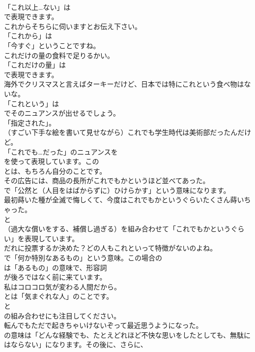 \documentclass[8pt]{extreport}
\begin{document}
\begin{CJK}{UTF8}{min}
\\	「これ以上…ない」は 
\\	で表現できます。	
\\	これからそちらに伺いますとお伝え下さい。 
\\	「これから」は
\\	「今すぐ」ということですね。	
\\	これだけの量の食料で足りるかい。 
\\	「これだけの量」は
\\	で表現できます。	
\\	海外でクリスマスと言えばターキーだけど、日本では特にこれという食べ物はないな。 
\\	「これという」は
\\	でそのニュアンスが出せるでしょう。
\\	「指定された」。	
\\	（すごい下手な絵を書いて見せながら）これでも学生時代は美術部だったんだけど。 
\\	「これでも…だった」のニュアンスを
\\	を使って表現しています。この
\\	とは、もちろん自分のことです。	
\\	その広告には、商品の長所がこれでもかというほど並べてあった。 
\\	で「公然と（人目をはばからずに）ひけらかす」という意味になります。	
\\	最初蒔いた種が全滅で悔しくて、今度はこれでもかというぐらいたくさん蒔いちゃった。 
\\	と 
\\	（過大な償いをする、補償し過ぎる）を組み合わせて「これでもかというぐらい」を表現しています。	
\\	だれに投票するか決めた？どの人もこれといって特徴がないのよね。 
\\	で「何か特別なあるもの」という意味。この場合の 
\\	は「あるもの」の意味で、形容詞 
\\	が後ろではなく前に来ています。	
\\	私はコロコロ気が変わる人間だから。 
\\	とは「気まぐれな人」のことです。
\\	と 
\\	の組み合わせにも注目してください。	
\\	転んでもただで起きちゃいけないぞって最近思うようになった。 
\\	の意味は「どんな経験でも、たとえどれほど不快な思いをしたとしても、無駄にはならない」になります。その後に、さらに、

\end{CJK}
\end{document}
